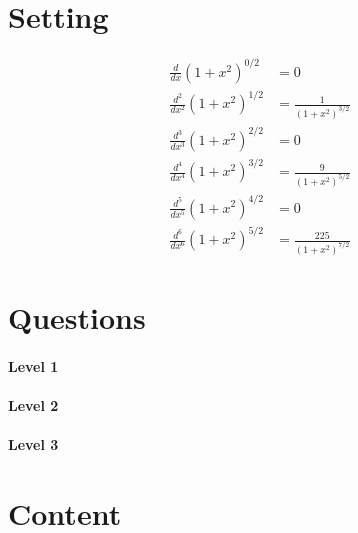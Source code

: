 \documentclass{ximera}
\begin{document}
\section{Setting}

\vfil

\begin{align*}
  \frac{d}{dx} \left(1+x^2\right)^{0/2} &=0\\
  \frac{d^2}{dx^2} \left(1+x^2\right)^{1/2} &= \frac{1}{\left(1+x^2\right)^{3/2}}\\
  \frac{d^3}{dx^3} \left(1+x^2\right)^{2/2} &= 0\\
  \frac{d^4}{dx^4} \left(1+x^2\right)^{3/2} &= \frac{9}{\left(1+x^2\right)^{5/2}}\\
  \frac{d^5}{dx^5} \left(1+x^2\right)^{4/2} &= 0\\
  \frac{d^6}{dx^6} \left(1+x^2\right)^{5/2} &= \frac{225}{\left(1+x^2\right)^{7/2}}
\end{align*}

\vfil

\vfil

\newpage

\section{Questions}

\paragraph{Level 1}

\paragraph{Level 2}

\paragraph{Level 3}


\section{Content}
\end{document}
